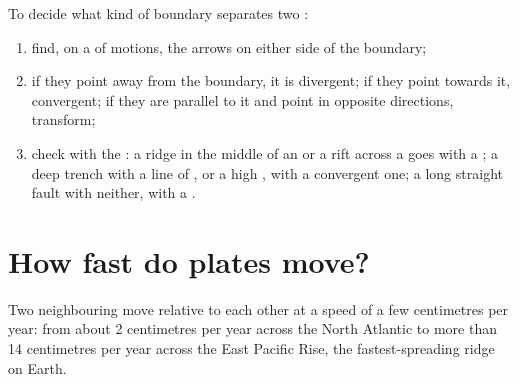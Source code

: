 \begin{method}\label{met:g7:plate-tectonics:recognise}
To decide what kind of boundary separates two :
\begin{enumerate}
  \item find, on a  of  motions, the arrows on either side of the
        boundary;
  \item if they point away from the boundary, it is divergent; if they
        point towards it, convergent; if they are parallel to it and point
        in opposite directions, transform;
  \item check with the : a ridge in the middle of an  or a
        rift across a  goes with a ; a deep
        trench with a line of , or a high , with a
        convergent one; a long straight fault with neither, with a
        .
\end{enumerate}
\end{method}

\section{How fast do plates move?}

\begin{proposition}\label{prop:g7:plate-tectonics:speed}
Two neighbouring  move relative to each other at a speed of a few
centimetres per year: from about 2 centimetres per year across the
North Atlantic to more than 14 centimetres per year across the East Pacific
Rise, the fastest-spreading ridge on Earth.
\end{proposition}

